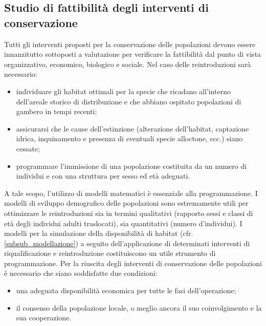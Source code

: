 \documentclass[11pt,a4paper,italian,twoside,openany]{memoir}
\begin{document}
\subsection{Studio di fattibilità degli interventi di conservazione}
\label{sub_studio}
Tutti gli interventi proposti per la conservazione delle popolazioni devono essere innanzitutto sottoposti a valutazione per verificare la fattibilità dal punto di vista organizzativo, economico, biologico e sociale.
Nel caso delle reintroduzioni sarà necessario:
\begin{itemize}
  \item individuare gli habitat ottimali per la specie che ricadano all'interno dell'areale storico di distribuzione e che abbiano ospitato popolazioni di gambero in tempi recenti; 
  \item assicurarsi che le cause dell'estinzione (alterazione dell'habitat, captazione idrica, inquinamento e presenza di eventuali specie alloctone, ecc.) siano cessate; 
  \item programmare l'immissione di una popolazione costituita da un numero di individui e con una struttura per sesso ed età adeguati.
\end{itemize}

A tale scopo, l'utilizzo di modelli matematici è essenziale alla programmazione. I modelli di sviluppo demografico delle popolazioni sono estremamente utili per ottimizzare le reintroduzioni sia in termini qualitativi (rapporto sessi e classi di età degli individui adulti traslocati), sia quantitativi (numero d'individui). I modelli per la simulazione della disponibilità di habitat (cfr. \ref{subsub_modellazione}) a seguito dell'applicazione di determinati interventi di riqualificazione e reintroduzione costituiscono un utile strumento di programmazione. 
Per la riuscita degli interventi di conservazione delle popolazioni è necessario che siano soddisfatte due condizioni:
\begin{itemize}
  \item una adeguata disponibilità economica per tutte le fasi dell'operazione;
  \item il consenso della popolazione locale, o meglio ancora il suo coinvolgimento e la sua cooperazione.
\end{itemize}
\end{document}
